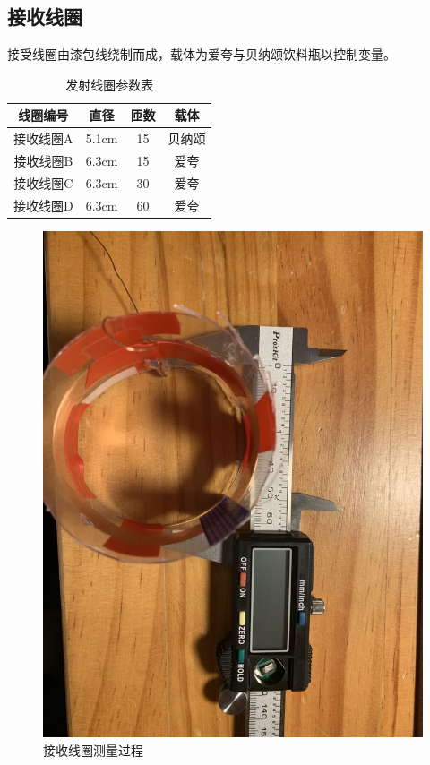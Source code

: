 \documentclass[conference]{IEEEtran}
\theoremstyle{break}
\begin{document}
\subsection{接收线圈}
接受线圈由漆包线绕制而成，载体为爱夸与贝纳颂饮料瓶以控制变量。

\begin{table}[htbp]
        \caption{发射线圈参数表}
        \begin{center}
        \begin{tabular}{|c|c|c|c|}
        \hline
        \textbf{线圈编号}&\textbf{直径} & \textbf{匝数}& \textbf{载体} \\
        \hline
        接收线圈A	&5.1cm	&15&	贝纳颂\\
        \hline
        接收线圈B	&6.3cm	&15	&爱夸\\
        \hline
        接收线圈C	&6.3cm	&30	&爱夸\\
        \hline 
        接收线圈D	&6.3cm&	60	&爱夸\\
        \hline
        \end{tabular}
        \label{tab1}
        \end{center}
        \end{table}

        \begin{figure}[htbp]
                \centerline{\includegraphics[scale=0.1]{接收线圈测量过程.png}}
                \caption{接收线圈测量过程}
                \label{fig}
                \end{figure}
        
\end{document}
